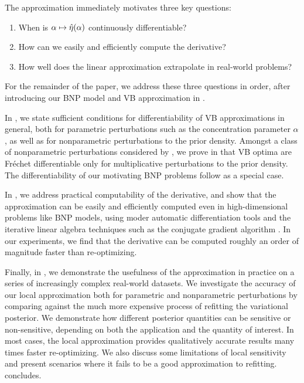 The approximation immediately motivates three key questions:
%
\begin{enumerate}
%
\item {}
    When is $\alpha \mapsto \hat\eta(\alpha)$ continuously differentiable?
%
\item {}
    How can we easily and efficiently compute the derivative?
%
\item {}
    How well does the linear approximation extrapolate in real-world problems?
%
\end{enumerate}
%
For the remainder of the paper, we address these three questions in order, after
introducing our BNP model and VB approximation in .

In , we state sufficient conditions for
differentiability of VB approximations in general, both for parametric
perturbations such as the concentration parameter $\alpha$, as well as for
nonparametric perturbations to the prior density.  Amongst a class of
nonparametric perturbations considered by \citet{gustafson:1996:local}, we prove
in  that VB optima are Fr{\'e}chet
differentiable only for multiplicative perturbations to the prior density. The
differentiability of our motivating BNP problems follow as a special case.

In , we address practical computability of the
derivative, and show that the approximation can be easily and efficiently
computed even in high-dimensional problems like BNP models, using moder
automatic differentiation tools \citep{baydin:2018:automatic, jax2018github} and
the iterative linear algebra techniques such as the conjugate gradient algorithm
\citep{nocedal:2006:numerical}.  In our experiments, we find that the derivative
can be computed roughly an order of magnitude faster than re-optimizing.

Finally, in , we demonstrate the usefulness of the approximation
in practice on a series of increasingly complex real-world datasets.  We
investigate the accuracy of our local approximation both for parametric and
nonparametric perturbations by comparing against the much more expensive process
of refitting the variational posterior.  We demonstrate how different posterior
quantities can be sensitive or non-sensitive, depending on both the application
and the quantity of interest.  In most cases, the local approximation provides
qualitatively accurate results many times faster re-optimizing.  We also discuss
some limitations of local sensitivity and present scenarios where it fails to be
a good approximation to refitting.  concludes.

